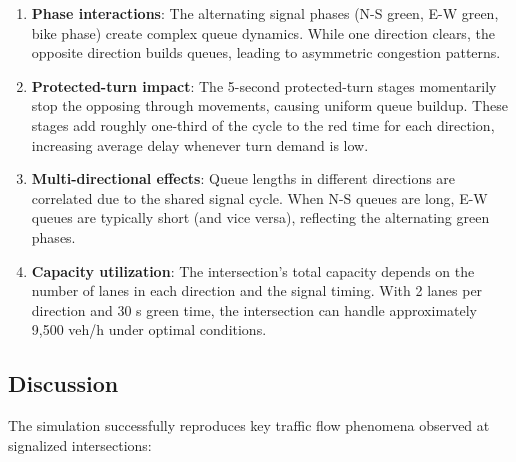 \begin{enumerate}
    \item \textbf{Phase interactions}: The alternating signal phases (N-S green, E-W green, bike phase) create complex queue dynamics. While one direction clears, the opposite direction builds queues, leading to asymmetric congestion patterns.
    
    \item \textbf{Protected-turn impact}: The 5-second protected-turn stages momentarily stop the opposing through movements, causing uniform queue buildup. These stages add roughly one-third of the cycle to the red time for each direction, increasing average delay whenever turn demand is low.
    
    \item \textbf{Multi-directional effects}: Queue lengths in different directions are correlated due to the shared signal cycle. When N-S queues are long, E-W queues are typically short (and vice versa), reflecting the alternating green phases.
    
    \item \textbf{Capacity utilization}: The intersection's total capacity depends on the number of lanes in each direction and the signal timing. With 2 lanes per direction and 30 s green time, the intersection can handle approximately 9,500 veh/h under optimal conditions.
\end{enumerate}

\subsection{Discussion}

The simulation successfully reproduces key traffic flow phenomena observed at signalized intersections:

